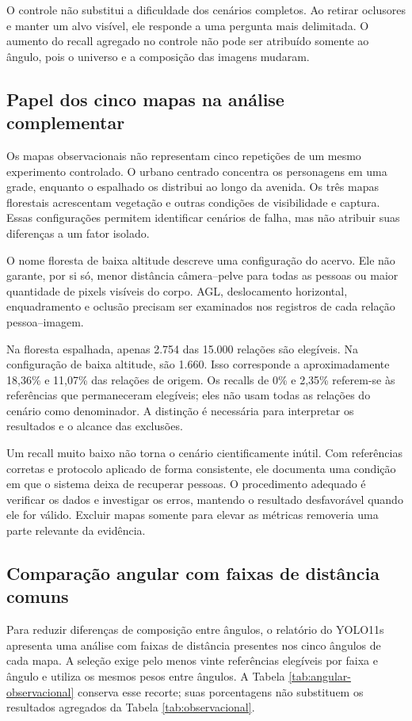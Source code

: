 O controle não substitui a dificuldade dos cenários completos. Ao retirar oclusores e manter um alvo visível, ele responde a uma pergunta mais delimitada. O aumento do recall agregado no controle não pode ser atribuído somente ao ângulo, pois o universo e a composição das imagens mudaram.

\subsection{Papel dos cinco mapas na análise complementar}
Os mapas observacionais não representam cinco repetições de um mesmo experimento controlado. O urbano centrado concentra os personagens em uma grade, enquanto o espalhado os distribui ao longo da avenida. Os três mapas florestais acrescentam vegetação e outras condições de visibilidade e captura. Essas configurações permitem identificar cenários de falha, mas não atribuir suas diferenças a um fator isolado.

O nome floresta de baixa altitude descreve uma configuração do acervo. Ele não garante, por si só, menor distância câmera--pelve para todas as pessoas ou maior quantidade de pixels visíveis do corpo. AGL, deslocamento horizontal, enquadramento e oclusão precisam ser examinados nos registros de cada relação pessoa--imagem.

Na floresta espalhada, apenas 2.754 das 15.000 relações são elegíveis. Na configuração de baixa altitude, são 1.660. Isso corresponde a aproximadamente 18,36\% e 11,07\% das relações de origem. Os recalls de 0\% e 2,35\% referem-se às referências que permaneceram elegíveis; eles não usam todas as relações do cenário como denominador. A distinção é necessária para interpretar os resultados e o alcance das exclusões.

Um recall muito baixo não torna o cenário cientificamente inútil. Com referências corretas e protocolo aplicado de forma consistente, ele documenta uma condição em que o sistema deixa de recuperar pessoas. O procedimento adequado é verificar os dados e investigar os erros, mantendo o resultado desfavorável quando ele for válido. Excluir mapas somente para elevar as métricas removeria uma parte relevante da evidência.

\subsection{Comparação angular com faixas de distância comuns}
Para reduzir diferenças de composição entre ângulos, o relatório do YOLO11s apresenta uma análise com faixas de distância presentes nos cinco ângulos de cada mapa. A seleção exige pelo menos vinte referências elegíveis por faixa e ângulo e utiliza os mesmos pesos entre ângulos. A Tabela \ref{tab:angular-observacional} conserva esse recorte; suas porcentagens não substituem os resultados agregados da Tabela \ref{tab:observacional}.

